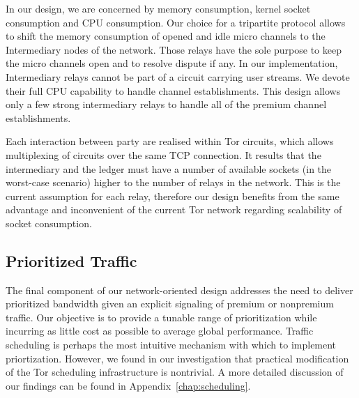 In our design, we are concerned by memory consumption, kernel socket consumption and CPU consumption. Our choice for a tripartite protocol allows to shift the memory consumption of opened and idle micro channels to the Intermediary nodes of the network. Those relays have the sole purpose to keep the micro channels open and to resolve dispute if any. In our implementation, Intermediary relays cannot be part of a circuit carrying user streams. We devote their full CPU capability to handle channel establishments. This design allows only a few strong intermediary relays to handle all of the premium channel establishments.

Each interaction between party are realised within Tor circuits, which allows
multiplexing of circuits over the same TCP connection. It results that the
intermediary and the ledger must have a number of available sockets (in the
worst-case scenario) higher to the number of relays in the network. This is the
current assumption for each relay, therefore our design benefits from the same
advantage and inconvenient of the current Tor network regarding scalability of
socket consumption.

\subsection{Prioritized Traffic}
\label{subsub:prioritized}

The final component of our network-oriented design addresses the need to deliver
prioritized bandwidth given an explicit signaling of premium or nonpremium
traffic. Our objective is to provide a tunable range of prioritization while
incurring as little cost as possible to average global performance. Traffic
scheduling is perhaps the most intuitive mechanism with which to implement
priortization. However, we found in our investigation that practical
modification of the Tor scheduling infrastructure is nontrivial. A more detailed
discussion of our findings can be found in Appendix~\ref{chap:scheduling}.

